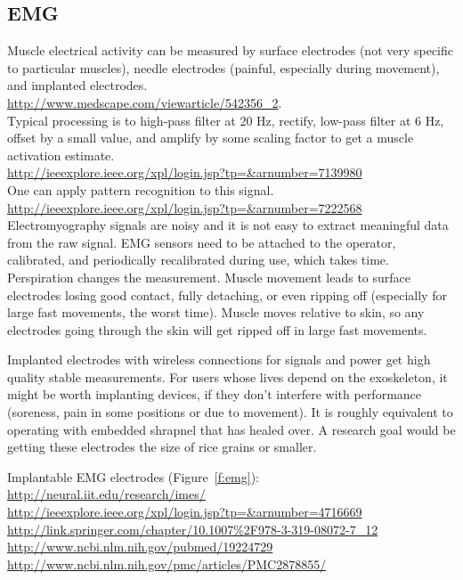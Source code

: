 \documentclass[letterpaper,12pt,fullpage]{article}
\begin{document}
\subsection{EMG}

Muscle electrical activity can be measured by surface electrodes
(not very specific to particular muscles), needle electrodes (painful,
especially during movement), and implanted electrodes.\\
\url{http://www.medscape.com/viewarticle/542356_2}.\\
Typical processing is to 
high-pass filter at 20 Hz, rectify, low-pass filter at 6 Hz,
offset by a small value, and amplify by some scaling factor
to get a muscle activation estimate.\\
\url{http://ieeexplore.ieee.org/xpl/login.jsp?tp=&arnumber=7139980}\\
One can apply pattern recognition to this signal.\\
\url{http://ieeexplore.ieee.org/xpl/login.jsp?tp=&arnumber=7222568}\\

Electromyography 
signals are noisy and it is not easy to extract
meaningful data from the raw signal. 
EMG sensors
need to be attached to the operator, calibrated,
and periodically recalibrated during use, which takes time.
Perspiration changes the measurement. 
Muscle movement leads to surface electrodes losing good contact,
fully detaching, or
even ripping off (especially for large fast
movements, the worst time). Muscle moves relative to skin,
so any electrodes going through the skin will get ripped off
in large fast movements. 

Implanted electrodes
with wireless connections for signals and power
get high quality stable measurements.
For users whose lives depend on the exoskeleton,
it might be worth implanting devices, if they don't interfere
with performance (soreness, pain in some positions or due to
movement). It is roughly equivalent to
operating with embedded shrapnel that has healed over.
A research goal would be getting these electrodes the size of rice
grains or smaller.

Implantable EMG electrodes (Figure~\ref{f:emg}):\\
\url{http://neural.iit.edu/research/imes/}\\
\url{http://ieeexplore.ieee.org/xpl/login.jsp?tp=&arnumber=4716669}\\
\url{http://link.springer.com/chapter/10.1007\%2F978-3-319-08072-7_12}\\
\url{http://www.ncbi.nlm.nih.gov/pubmed/19224729}\\
\url{http://www.ncbi.nlm.nih.gov/pmc/articles/PMC2878855/}\\
\end{document}
